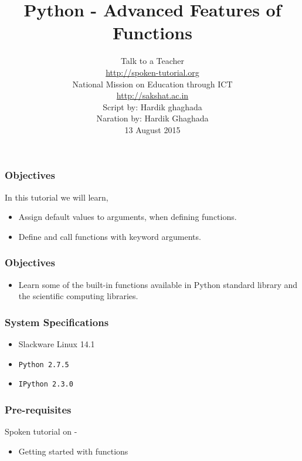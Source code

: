\documentclass[17pt,compress]{beamer}
\author[FOSSEE]{}
\institute[IIT Bombay]{}
\date[]{}
\begin{document}
\sffamily \bfseries
\title
[Advanced Features of Functions]
{Python - Advanced Features of Functions}
\author
[FOSSEE, IIT - Bombay]
{\small Talk to a Teacher\\{\color{blue}\url{http://spoken-tutorial.org}}\\National Mission on Education
 through ICT\\{\color{blue}\url{http://sakshat.ac.in}} \\[0.5cm]{\tiny Script by: Hardik ghaghada \\ Naration by: Hardik Ghaghada \\ 13 August 2015}}

\begin{frame}
   \titlepage
\end{frame}
\begin{frame}
\frametitle{Objectives}
\label{sec-2.1}

  In this tutorial we will learn, \pause
\begin{itemize}
\item Assign default values to arguments, when defining functions.\pause
\item Define and call functions with keyword arguments.
\end{itemize}
\end{frame}
\begin{frame}
\frametitle{Objectives}
\label{sec-2.2}
\begin{itemize}
\item Learn some of the built-in functions available in Python standard 
    library and the scientific computing libraries.
\end{itemize}
\end{frame}
\begin{frame}
\frametitle{System Specifications}\pause
\begin{itemize}
\item Slackware Linux 14.1\pause
\item \texttt{Python 2.7.5} \pause
\item \texttt{IPython 2.3.0}
\end{itemize}
\end{frame}
\begin{frame}
\frametitle{Pre-requisites}
\label{sec-3}

Spoken tutorial on -

\begin{itemize}
\item Getting started with functions
\end{itemize}
\end{frame}
\end{document}
